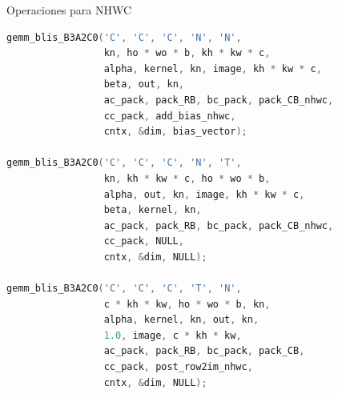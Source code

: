 \documentclass[aspectratio=43]{beamer}
\newcommand{\subsectiontoc}[1]{
    \subsection{#1}
    \begin{frame}%
    \tableofcontents[currentsubsection]
    \end{frame}
}
\begin{document}

\begin{frame}[fragile]{Operaciones para NHWC}
\begin{lstlisting}[language=C,basicstyle=\scriptsize\ttfamily]
gemm_blis_B3A2C0('C', 'C', 'C', 'N', 'N',
                 kn, ho * wo * b, kh * kw * c,
                 alpha, kernel, kn, image, kh * kw * c,
                 beta, out, kn,
                 ac_pack, pack_RB, bc_pack, pack_CB_nhwc,
                 cc_pack, add_bias_nhwc,
                 cntx, &dim, bias_vector);

gemm_blis_B3A2C0('C', 'C', 'C', 'N', 'T',
                 kn, kh * kw * c, ho * wo * b,
                 alpha, out, kn, image, kh * kw * c,
                 beta, kernel, kn,
                 ac_pack, pack_RB, bc_pack, pack_CB_nhwc,
                 cc_pack, NULL,
                 cntx, &dim, NULL);

gemm_blis_B3A2C0('C', 'C', 'C', 'T', 'N',
                 c * kh * kw, ho * wo * b, kn,
                 alpha, kernel, kn, out, kn,
                 1.0, image, c * kh * kw,
                 ac_pack, pack_RB, bc_pack, pack_CB,
                 cc_pack, post_row2im_nhwc,
                 cntx, &dim, NULL);
\end{lstlisting}
\end{frame}

\begin{frame}%
\end{frame}

\begin{frame}%
\end{frame}

\begin{frame}%
\end{frame}
\end{document}
